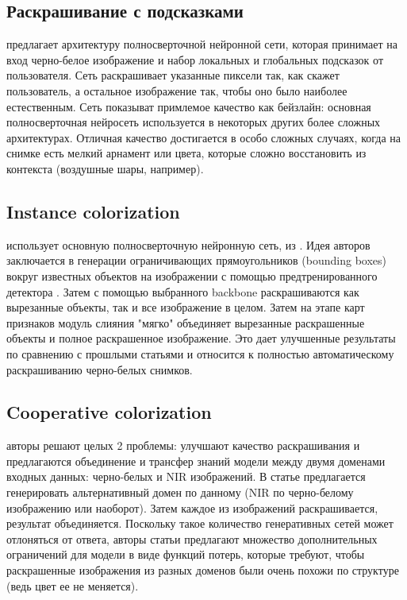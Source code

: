 \documentclass[14pt]{article}
\begin{document}
\subsection{Раскрашивание с подсказками}
\cite{GuidedImageColorization} предлагает архитектуру полносверточной нейронной сети, которая принимает на вход
черно-белое изображение и набор локальных и глобальных подсказок от пользователя. Сеть раскрашивает указанные пиксели так, как
скажет пользователь, а остальное изображение так, чтобы оно было наиболее естественным. Сеть показыват примлемое качество
как бейзлайн: основная полносверточная нейросеть используется в некоторых других более сложных архитектурах. Отличная качество достигается
в особо сложных случаях, когда на снимке есть мелкий арнамент или цвета, которые сложно восстановить из контекста (воздушные шары, например).

\subsection{Instance colorization}
\cite{InstaColor} использует основную полносверточную нейронную сеть, из \cite{GuidedImageColorization}. Идея авторов заключается в генерации
ограничивающих прямоугольников (bounding boxes) вокруг известных объектов на изображении с помощью предтренированного детектора \cite{MaskCNN}.
Затем с помощью выбранного backbone раскрашиваются как вырезанные объекты, так и все изображение в целом. Затем на этапе карт признаков
модуль слияния "мягко" объединяет вырезанные раскрашенные объекты и полное раскрашенное изображение. Это дает улучшенные результаты по сравнению с прошлыми статьями
и относится к полностью автоматическому раскрашиванию черно-белых снимков.

\subsection{Cooperative colorization}
\cite{CoColor} авторы решают целых 2 проблемы: улучшают качество раскрашивания и предлагаются объединение и трансфер знаний модели между двумя доменами входных данных:
черно-белых и NIR изображений. В статье предлагается генерировать альтернативный домен по данному (NIR по черно-белому изображению или наоборот). Затем каждое
из изображений раскрашивается, результат объединяется. Поскольку такое количество генеративных сетей может отлоняться от ответа, авторы статьи предлагают множество дополнительных
ограничений для модели в виде функций потерь, которые требуют, чтобы раскрашенные изображения из разных доменов были очень похожи по структуре (ведь цвет ее не меняется).
\end{document}
